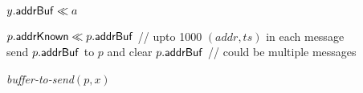 \begin{algorithm*}[]
 {
     { {$y.\textnormal{\textsf{{addrBuf}}} \ll a$}
    }
}

 {
   {
    $p.\textnormal{\textsf{{addrKnown}}} \ll p.\textnormal{\textsf{{addrBuf}}}$ // upto 1000 $(addr, ts)$ in each message \\
    send $p.\textnormal{\textsf{{addrBuf}}}$ to $p$ and clear $p.\textnormal{\textsf{{addrBuf}}}$   // could be multiple messages \\
  }
 }

 {
   {\textit{buffer-to-send}$(p, x)$
  }
}

\end{algorithm*}
